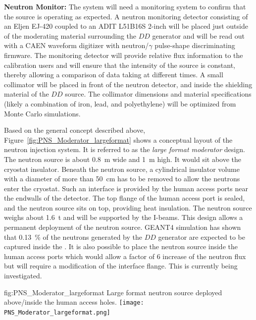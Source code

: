  
{\bf Neutron Monitor:} The system will need a monitoring system to confirm that the source is operating as expected.  A neutron monitoring detector consisting of an Eljen EJ-420 coupled to an ADIT L51B16S \num{2}-inch  will be placed just outside of the moderating material surrounding the $DD$ generator and will be read out with a CAEN waveform digitizer with neutron/$\gamma$ pulse-shape discriminating firmware. The monitoring detector will provide relative flux information to the calibration users and will ensure that the intensity of the source is constant, thereby allowing a comparison of data taking at different times.  A small collimator will be placed in front of the neutron detector, and inside the shielding material of the $DD$ source. The collimator dimensions and material specifications (likely a combination of iron, lead, and polyethylene) will be optimized from Monte Carlo simulations.

Based on the general concept described above, Figure~\ref{fig:PNS_Moderator_largeformat} shows a conceptual layout of the neutron injection system. It is referred to as the {\it large format moderator} design. The neutron source is about \SI{0.8}{\m} wide and \SI{1}{\m} high. It would sit above the cryostat insulator. Beneath the neutron source, a cylindrical insulator volume with a diameter of more than \SI{50}{\cm} has to be removed to allow the neutrons enter the cryostat. Such an interface is provided by the human access ports near the endwalls of the detector.
The top flange of the human access port is sealed, and the neutron source sits on top, providing heat insulation. The neutron source weighs about \SI{1.6}{\tonne} and will be supported by the I-beams. 
This design allows a permanent deployment of the neutron source. GEANT4 simulation has shown that \SI{0.13}{\%} of the neutrons generated by the $DD$ generator are expected to be captured inside the . It is also possible to place the neutron source inside the human access ports which would allow a factor of \num{6} increase of the neutron flux but will require a modification of the interface flange. This is currently being investigated.

\begin{dunefigure}{fig:PNS_Moderator_largeformat}
{Large format neutron source deployed above/inside the human access holes.}
\texttt{[image: PNS\_Moderator\_largeformat.png]}
\end{dunefigure}



